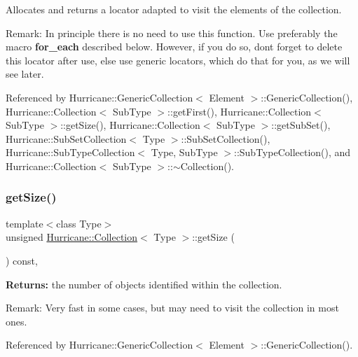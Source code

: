 Allocates and returns a locator adapted to visit the elements of the collection.

\begin{DoxyParagraph}{Remark\+:}
In principle there is no need to use this function. Use preferably the macro {\bfseries for\+\_\+each} described below. However, if you do so, don\textquotesingle{}t forget to delete this locator after use, else use generic locators, which do that for you, as we will see later. 
\end{DoxyParagraph}


Referenced by Hurricane\+::\+Generic\+Collection$<$ Element $>$\+::\+Generic\+Collection(), Hurricane\+::\+Collection$<$ Sub\+Type $>$\+::get\+First(), Hurricane\+::\+Collection$<$ Sub\+Type $>$\+::get\+Size(), Hurricane\+::\+Collection$<$ Sub\+Type $>$\+::get\+Sub\+Set(), Hurricane\+::\+Sub\+Set\+Collection$<$ Type $>$\+::\+Sub\+Set\+Collection(), Hurricane\+::\+Sub\+Type\+Collection$<$ Type, Sub\+Type $>$\+::\+Sub\+Type\+Collection(), and Hurricane\+::\+Collection$<$ Sub\+Type $>$\+::$\sim$\+Collection().

\mbox{\label{classHurricane_1_1Collection_a1292aabe88c9aadfdfe21dabddb62c19}} 
\subsubsection{\texorpdfstring{get\+Size()}{getSize()}}
{\footnotesize\ttfamily template$<$class Type$>$ \\
unsigned \hyperlink{classHurricane_1_1Collection}{Hurricane\+::\+Collection}$<$ Type $>$\+::get\+Size (\begin{DoxyParamCaption}{ }\end{DoxyParamCaption}) const\hspace{0.3cm}{\ttfamily [inline]}, {\ttfamily [virtual]}}

{\bfseries Returns\+:} the number of objects identified within the collection.

\begin{DoxyParagraph}{Remark\+:}
Very fast in some cases, but may need to visit the collection in most ones. 
\end{DoxyParagraph}


Referenced by Hurricane\+::\+Generic\+Collection$<$ Element $>$\+::\+Generic\+Collection().


